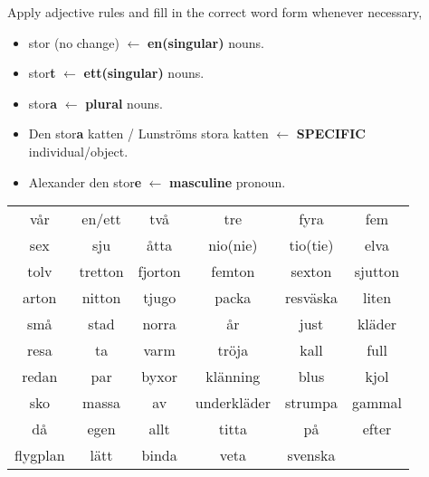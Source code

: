 \begin{flushleft}
    Apply adjective rules and fill in the correct word form whenever necessary, \\
    \begin{itemize}
        \item stor (no change) $\leftarrow$ \textbf{en(singular)} nouns.
        \item stor\textbf{t} $\leftarrow$ \textbf{ett(singular)} nouns.
        \item stor\textbf{a} $\leftarrow$ \textbf{plural} nouns.
        \item Den stor\textbf{a} katten / Lunströms stora katten $\leftarrow$ \textbf{SPECIFIC} individual/object.
        \item Alexander den stor\textbf{e} $\leftarrow$ \textbf{masculine} pronoun.
    \end{itemize}
\end{flushleft}
\begin{center}
    \begin{tabular}{|c c c c c c|}
        \hline
        vår & en/ett & två & tre & fyra & fem \\
        sex & sju & åtta & nio(nie) & tio(tie) & elva \\
        tolv & tretton & fjorton & femton & sexton & sjutton \\
        arton & nitton & tjugo & packa & resväska & liten \\
        små & stad & norra & år & just &  kläder \\
        resa & ta & varm & tröja & kall & full  \\
        redan & par & byxor & klänning & blus & kjol  \\
        sko & massa & av & underkläder & strumpa & gammal \\
        då & egen & allt & titta & på &  efter \\
        flygplan & lätt & binda & veta & svenska & \\
        \hline
    \end{tabular}
\end{center}

